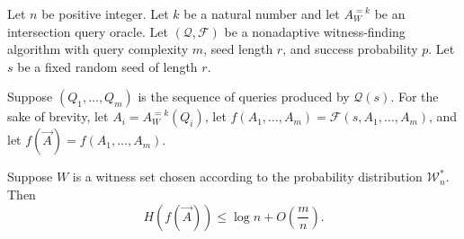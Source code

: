 \documentclass{article}
\newcommand{\mc}{\mathcal}
\begin{document}
\begin{lemma}
  Let $n$ be positive integer.
  Let $k$ be a natural number and let $A^{= k}_W$ be an intersection query oracle.
  Let $(\mc{Q}, \mc{F})$ be a nonadaptive witness-finding algorithm with query complexity $m$, seed length $r$, and success probability $p$.
  Let $s$ be a fixed random seed of length $r$.

  Suppose $(Q_1, \dotsc, Q_m)$ is the sequence of queries produced by $\mc{Q}(s)$.
  For the sake of brevity, let $A_i = A^{=k}_W(Q_i)$, let $f(A_1, \dotsc, A_m) = \mc{F}(s, A_1, \dotsc, A_m)$, and let $f(\vec{A}) = f(A_1, \dotsc, A_m)$.

  Suppose $W$ is a witness set chosen according to the probability distribution $\mc{W}_n^*$.
  Then
  \begin{equation*}
    H(f(\vec{A})) \leq \log n + O\left(\frac{m}{n}\right).
  \end{equation*}
\end{lemma}
\end{document}
